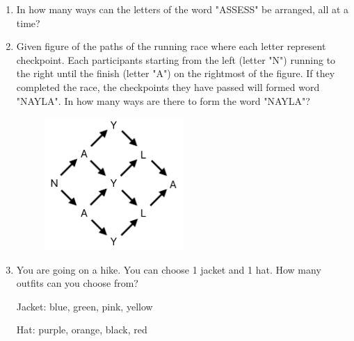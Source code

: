 \documentclass[11pt]{scrartcl}
\begin{document}
\begin{enumerate}
    \item In how many ways can the letters of the word "ASSESS" be arranged, all at a time?
    
    \item Given figure of the paths of the running race where each letter represent checkpoint. Each participants starting from the left (letter "N") running to the right until the finish (letter "A") on the rightmost of the figure. If they completed the race, the checkpoints they have passed will formed word "NAYLA". In how many ways are there to form the word "NAYLA"?
    \begin{figure}[h]
        \centering
        \includegraphics[width=0.5\textwidth]{StarGen/0Figure/running-race-nayla.png}
    \end{figure}
    
    \item You are going on a hike. You can choose 1 jacket and 1 hat. How many outfits can you choose from?
    \begin{tcolorbox}[colback=red!10,colframe=red!75!black]
    Jacket: blue, green, pink, yellow
    \end{tcolorbox}
    \begin{tcolorbox}[colback=blue!10,colframe=blue!75!black]
    Hat: purple, orange, black, red
    \end{tcolorbox}
    

\end{enumerate}
\end{document}
